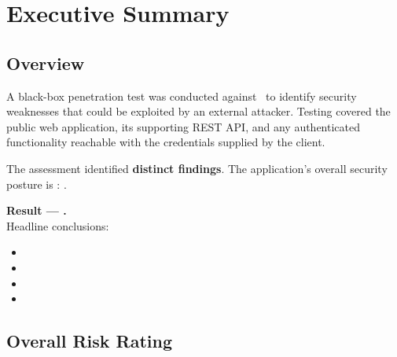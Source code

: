 \section{Executive Summary}
\subsection{Overview}
A black-box penetration test was conducted against \reporttarget\ to identify security weaknesses
that could be exploited by an external attacker. Testing covered the public web application, its
supporting REST API, and any authenticated functionality reachable with the credentials supplied
by the client.

The assessment identified \textbf{ distinct findings}. The application's overall security
posture is \textbf{}: .

\begin{criticalbox}
\textbf{Result --- .}\\[6pt]
Headline conclusions:
\begin{itemize}
  \item {}
  \item {}
  \item {}
  \item {}
\end{itemize}
\end{criticalbox}

\subsection{Overall Risk Rating}
\begin{center}\end{center}

